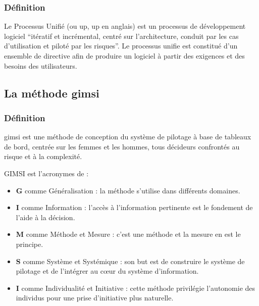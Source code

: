             \subsubsection[Définition]{Définition}
            Le Processus Unifié (ou \acrshort{up}, \acrlong{up} en anglais) est un
            processus de développement logiciel \enquote{itératif et incrémental,
            centré sur l’architecture, conduit par les cas d’utilisation
            et piloté par les risques}. \cite*{Roques2008} Le processus unifie
            est constitué d’un ensemble de directive afin de produire
            un logiciel à partir des exigences et des besoins des utilisateurs.
            \subsubsection[short]{}
        \subsection[La méthode GIMSI]{La méthode \acrshort{gimsi}}
            \subsubsection[Définition]{Définition}
            \acrshort*{gimsi} est une méthode de conception du système de pilotage à base 
            de tableaux de bord, centrée sur les femmes et les hommes,
            tous décideurs confrontés au risque et à la complexité. \cite*{fernandez2021gimsi}
            \par
            GIMSI est l'acronymes de :
            \par
                \begin{itemize}
                    \setlength{\itemsep}{0pt}
                    \item [\ding{226}] \textbf{G} comme Généralisation :
                    la méthode s’utilise dans différents domaines.
                    \item [\ding{226}] \textbf{I} comme Information : l’accès à l’information
                    pertinente est le fondement de l’aide à la décision.
                    \item [\ding{226}] \textbf{M} comme Méthode et Mesure : c’est une méthode
                    et la mesure en est le principe.
                    \item [\ding{226}] \textbf{S} comme Système et Systémique : son but est de construire le système de pilotage
                    et de l’intégrer au cœur du système d’information.
                    \item [\ding{226}] \textbf{I} comme Individualité et Initiative : cette méthode privilégie
                    l’autonomie des individus pour une prise d’initiative plus naturelle.
                \end{itemize}
